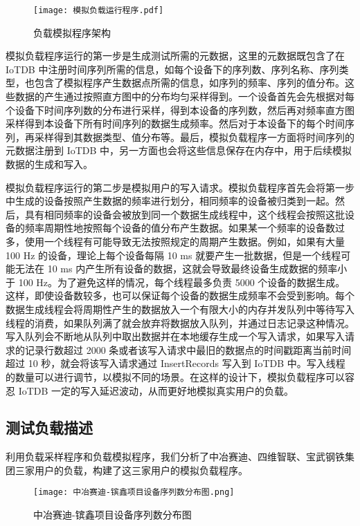 \begin{figure}
  \centering
  \texttt{[image: 模拟负载运行程序.pdf]}
  \caption{负载模拟程序架构}
  \label{fig:load-simulation-program}
\end{figure}

模拟负载程序运行的第一步是生成测试所需的元数据，这里的元数据既包含了在 IoTDB 中注册时间序列所需的信息，如每个设备下的序列数、序列名称、序列类型，也包含了模拟程序产生数据点所需的信息，如序列的频率、序列的值分布。这些数据的产生通过按照直方图中的分布均匀采样得到。一个设备首先会先根据对每个设备下时间序列数的分布进行采样，得到本设备的序列数，然后再对频率直方图采样得到本设备下所有时间序列的数据生成频率。然后对于本设备下的每个时间序列，再采样得到其数据类型、值分布等。最后，模拟负载程序一方面将时间序列的元数据注册到 IoTDB 中，另一方面也会将这些信息保存在内存中，用于后续模拟数据的生成和写入。

模拟负载程序运行的第二步是模拟用户的写入请求。模拟负载程序首先会将第一步中生成的设备按照产生数据的频率进行划分，相同频率的设备被归类到一起。然后，具有相同频率的设备会被放到同一个数据生成线程中，这个线程会按照这批设备的频率周期性地按照每个设备的值分布产生数据。如果某一个频率的设备数过多，使用一个线程有可能导致无法按照规定的周期产生数据。例如，如果有大量 100 Hz 的设备，理论上每个设备每隔 10 ms 就要产生一批数据，但是一个线程可能无法在 10 ms 内产生所有设备的数据，这就会导致最终设备生成数据的频率小于 100 Hz。为了避免这样的情况，每个线程最多负责 5000 个设备的数据生成。这样，即使设备数较多，也可以保证每个设备的数据生成频率不会受到影响。每个数据生成线程会将周期性产生的数据放入一个有限大小的内存并发队列中等待写入线程的消费，如果队列满了就会放弃将数据放入队列，并通过日志记录这种情况。写入队列会不断地从队列中取出数据并在本地缓存生成一个写入请求，如果写入请求的记录行数超过 2000 条或者该写入请求中最旧的数据点的时间戳距离当前时间超过 10 秒，就会将该写入请求通过 InsertRecords 写入到 IoTDB 中。写入线程的数量可以进行调节，以模拟不同的场景。在这样的设计下，模拟负载程序可以容忍 IoTDB 一定的写入延迟波动，从而更好地模拟真实用户的负载。
\subsection{测试负载描述}
利用负载采样程序和负载模拟程序，我们分析了中冶赛迪、四维智联、宝武钢铁集团三家用户的负载，构建了这三家用户的模拟负载程序。
\begin{figure}
  \centering
  \texttt{[image: 中冶赛迪-镔鑫项目设备序列数分布图.png]}
  \caption{中冶赛迪-镔鑫项目设备序列数分布图}
  \label{fig:zysd-bx-device-measurement-count}
\end{figure}

